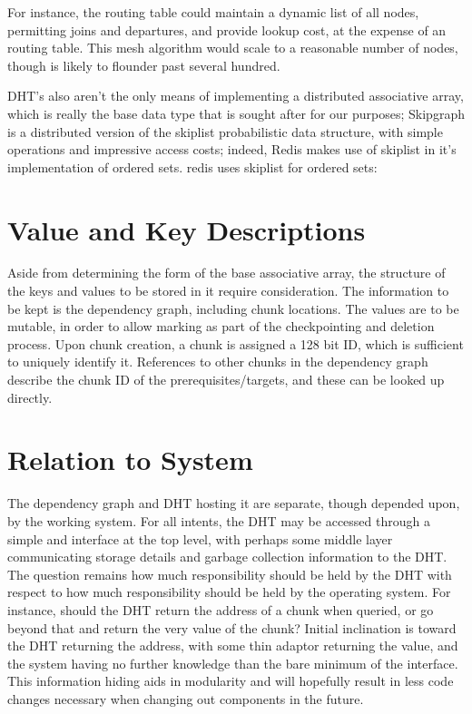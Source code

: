 \documentclass[10pt, a4paper]{article}
\begin{document}
For instance, the routing table could maintain a dynamic list of all nodes, permitting joins and departures, and provide  lookup cost, at the expense of an  routing table.
This mesh algorithm would scale to a reasonable number of nodes, though is likely to flounder past several hundred.

DHT's also aren't the only means of implementing a distributed associative array, which is really the base data type that is sought after for our purposes;
Skipgraph is a distributed version of the skiplist probabilistic data structure, with simple operations and impressive access costs; indeed, Redis makes use of skiplist in it's implementation of ordered sets.
redis uses skiplist for ordered sets: %

\section{Value and Key Descriptions}

Aside from determining the form of the base associative array, the structure of the keys and values to be stored in it require consideration.
The information to be kept is the dependency graph, including chunk locations.
The values are to be mutable, in order to allow marking as part of the checkpointing and deletion process.
Upon chunk creation, a chunk is assigned a 128 bit ID, which is sufficient to uniquely identify it.
References to other chunks in the dependency graph describe the chunk ID of the prerequisites/targets, and these can be looked up directly.

\section{Relation to System}

The dependency graph and DHT hosting it are separate, though depended upon, by the working \lsr{} system.
For all intents, the DHT may be accessed through a simple  and  interface at the top level, with perhaps some middle layer communicating storage details and garbage collection information to the DHT.
The question remains how much responsibility should be held by the DHT with respect to how much responsibility should be held by the operating \lsr{} system.
For instance, should the DHT return the address of a chunk when queried, or go beyond that and return the very value of the chunk?
Initial inclination is toward the DHT returning the address, with some thin adaptor returning the value, and the system having no further knowledge than the bare minimum of the interface.
This information hiding aids in modularity and will hopefully result in less code changes necessary when changing out components in the future.
\end{document}
